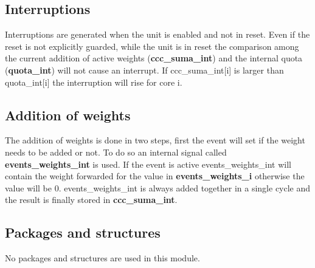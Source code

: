 \subsection{Interruptions}
Interruptions are generated  when the  unit is enabled and not in reset. Even if the reset is not explicitly guarded, while the unit is in reset the comparison among the current addition of active weights (\textbf{ccc\_suma\_int}) and the internal quota (\textbf{quota\_int}) will not cause an interrupt. If ccc\_suma\_int[i] is larger than quota\_int[i] the interruption will rise for core i. 

\subsection{Addition of weights}
The addition of weights is done in two steps, first the event will set if the weight needs to be added or not. To do so an internal signal called \textbf{events\_weights\_int} is used. If the event is active events\_weights\_int will contain the weight forwarded for the value in \textbf{events\_weights\_i} otherwise the value will be 0. events\_weights\_int is always added together in a single cycle and the result is finally stored in \textbf{ccc\_suma\_int}. 

\subsection{Packages and structures}

No packages and structures are used in this module.

